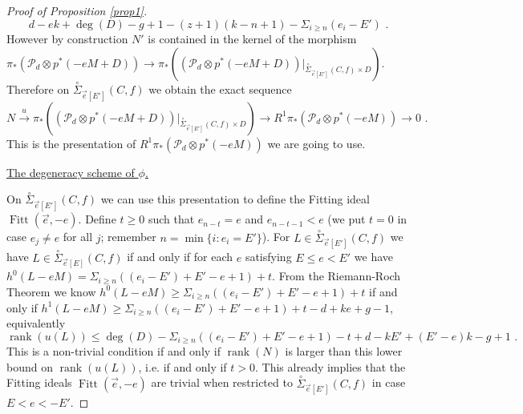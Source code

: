 \documentclass{article}
\DeclareMathOperator{\rk}{rank}
\DeclareMathOperator{\Fitt}{Fitt}
\theoremstyle{definition}
\theoremstyle{remark}
\begin{document}
\begin{proof}[Proof of Proposition \ref{prop1}]
\[d-ek+\deg (D)-g+1-(z+1)(k-n+1)-\Sigma _{i\geq n} (e_i-E') \text { .}
\]
However by construction $N'$ is contained in the kernel of the morphism $\pi_*(\mathcal {P}_d \otimes p^*(-eM+D))\rightarrow \pi_*((\mathcal {P}_d \otimes p^*(-eM+D))\vert _{\overset{\circ}{\Sigma} _{\overrightarrow {e}[E']}(C,f)\times D})$.
Therefore on $\overset {\circ}{\Sigma}_{\overrightarrow {e}[E']}(C,f)$ we obtain the exact sequence
\[
N \xrightarrow{u} \pi_*((\mathcal{P}_d\otimes p^*(-eM+D))\vert _{\overset {\circ}{\Sigma}_{\overrightarrow {e}[E']}(C,f)\times D}) \rightarrow R^1\pi_*(\mathcal{P}_d\otimes p^*(-eM))\rightarrow 0 \text { .}
\]
This is the presentation of $R^1\pi_*(\mathcal{P}_d \otimes p^*(-eM))$ we are going to use.

\underline{The degeneracy scheme of $\phi$.}

On $\overset {\circ}{\Sigma}_{\overrightarrow {e}[E']}(C,f)$ we can use this presentation to define the Fitting ideal $\Fitt (\overrightarrow {e},-e)$.
Define $t \geq 0$ such that $e_{n-t}=e$ and $e_{n-t-1}<e$ (we put $t=0$ in case $e_j\neq e$ for all $j$; remember $n = \min \{i : e_i=E' \}$).
For $L \in \overset {\circ}{\Sigma}_{\overrightarrow {e}[E']}(C,f)$ we have $L \in \overset {\circ}{\Sigma} _{\overrightarrow {e}[E]}(C,f)$ if and only if for each $e$ satisfying $E \leq e < E'$ we have $h^0(L-eM)= \Sigma _{i\geq n} ((e_i-E')+E'-e+1)+t$.
From the Riemann-Roch Theorem we know $h^0(L-eM)\geq \Sigma _{i\geq n} ((e_i-E')+E'-e+1)+t$ if and only if $h^1(L-eM)\geq \Sigma _{i \geq n}((e_i-E')+E'-e+1)+t-d+ke+g-1$, equivalently 
\[
\rk (u(L)) \leq \deg (D) - \Sigma _{i \geq n}((e_i-E')+E'-e+1)-t+d-kE'+(E'-e)k-g+1 \text { .}
\]
This is a non-trivial condition if and only if $\rk (N)$ is larger than this lower bound on $\rk (u(L))$, i.e. if and only if $t>0$.
This already implies that the Fitting ideals $\Fitt (\overrightarrow {e},-e)$ are trivial when restricted to $\overset {\circ}{\Sigma} _{\overrightarrow {e}[E']}(C,f)$ in case $E < e <-E'$.


\end{proof}
\end{document}
